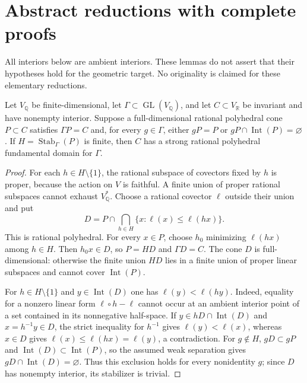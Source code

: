 \section{Abstract reductions with complete proofs}
All interiors below are ambient interiors. These lemmas do not assert that their hypotheses hold for the geometric target. No originality is claimed for these elementary reductions.

\begin{lemma}\label{lem:finite}
Let $V_{\mathbb Q}$ be finite-dimensional, let $\Gamma\subset\operatorname{GL}(V_{\mathbb Q})$, and let $C\subset V_{\mathbb R}$ be invariant and have nonempty interior. Suppose a full-dimensional rational polyhedral cone $P\subset C$ satisfies $\Gamma P=C$ and, for every $g\in\Gamma$, either $gP=P$ or $gP\cap\operatorname{Int}(P)=\varnothing$. If $H=\operatorname{Stab}_\Gamma(P)$ is finite, then $C$ has a strong rational polyhedral fundamental domain for $\Gamma$.
\end{lemma}
\begin{proof}
For each $h\in H\setminus\{1\}$, the rational subspace of covectors fixed by $h$ is proper, because the action on $V$ is faithful. A finite union of proper rational subspaces cannot exhaust $V_{\mathbb Q}^*$. Choose a rational covector $\ell$ outside their union and put
\[
 D=P\cap\bigcap_{h\in H}\{x:\ell(x)\leq\ell(hx)\}.
\]
This is rational polyhedral. For every $x\in P$, choose $h_0$ minimizing $\ell(hx)$ among $h\in H$. Then $h_0x\in D$, so $P=HD$ and $\Gamma D=C$. The cone $D$ is full-dimensional: otherwise the finite union $HD$ lies in a finite union of proper linear subspaces and cannot cover $\operatorname{Int}(P)$.

For $h\in H\setminus\{1\}$ and $y\in\operatorname{Int}(D)$ one has $\ell(y)<\ell(hy)$. Indeed, equality for a nonzero linear form $\ell\circ h-\ell$ cannot occur at an ambient interior point of a set contained in its nonnegative half-space. If $y\in hD\cap\operatorname{Int}(D)$ and $x=h^{-1}y\in D$, the strict inequality for $h^{-1}$ gives $\ell(y)<\ell(x)$, whereas $x\in D$ gives $\ell(x)\leq\ell(hx)=\ell(y)$, a contradiction. For $g\notin H$, $gD\subset gP$ and $\operatorname{Int}(D)\subset\operatorname{Int}(P)$, so the assumed weak separation gives $gD\cap\operatorname{Int}(D)=\varnothing$. Thus this exclusion holds for every nonidentity $g$; since $D$ has nonempty interior, its stabilizer is trivial.
\end{proof}

